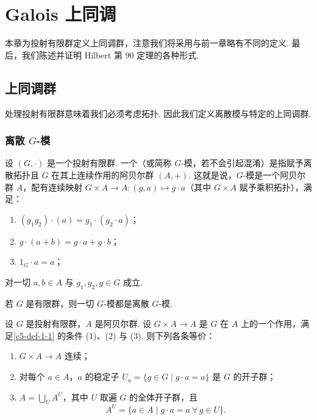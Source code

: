 
\chapter{Galois 上同调}
\label{ch:5}

本章为投射有限群定义上同调群，注意我们将采用与前一章略有不同的定义. 最后，我们陈述并证明 Hilbert 第 $90$ 定理的各种形式.

\section{上同调群}

处理投射有限群意味着我们必须考虑拓扑. 因此我们定义离散模与特定的上同调群.

\subsection{离散 \texorpdfstring{$G$}{G}-模}
\label{c5-sub-1-1}

\begin{definition}\label{c5-def-1-1}
设 $(G,\cdot)$ 是一个投射有限群. 一个（或简称 $G$-模，若不会引起混淆）是指赋予离散拓扑且 $G$ 在其上连续作用的阿贝尔群 $(A,+)$. 这就是说，$G$-模是一个阿贝尔群 $A$，配有连续映射 $G\times A\to A:(g,a)\mapsto g\cdot a$（其中 $G\times A$ 赋予乘积拓扑），满足：
\begin{enumerate}[label=(\arabic*),leftmargin=*]
    \item $(g_1g_2)\cdot(a)=g_1\cdot(g_2\cdot a)$；
    \item $g\cdot(a+b)=g\cdot a+g\cdot b$；
    \item $1_G\cdot a=a$；
\end{enumerate}
对一切 $a,b\in A$ 与 $g_1,g_2,g\in G$ 成立.
\end{definition}

\begin{remark}\label{c5-rem-1-2}
若 $G$ 是有限群，则一切 $G$-模都是离散 $G$-模.
\end{remark}

\begin{proposition}\label{c5-prop-1-1}
设 $G$ 是投射有限群，$A$ 是阿贝尔群. 设 $G\times A\to A$ 是 $G$ 在 $A$ 上的一个作用，满足\autoref{c5-def-1-1} 的条件 (1)、(2) 与 (3). 则下列各条等价：
\begin{enumerate}[label=(\arabic*),leftmargin=*]
    \item $G\times A\to A$ 连续；
    \item 对每个 $a\in A$，$a$ 的稳定子 $U_a=\{g\in G\mid g\cdot a=a\}$ 是 $G$ 的开子群；
    \item $A=\bigcup_U A^U$，其中 $U$ 取遍 $G$ 的全体开子群，且
    \[
    A^U=\{a\in A\mid g\cdot a=a\ \forall\, g\in U\}.
    \]
\end{enumerate}
\end{proposition}

